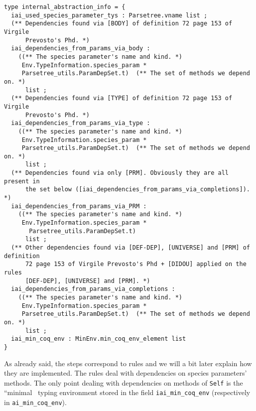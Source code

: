 {\footnotesize
\begin{lstlisting}[language=MyOCaml]
type internal_abstraction_info = {
  iai_used_species_parameter_tys : Parsetree.vname list ;
  (** Dependencies found via [BODY] of definition 72 page 153 of Virgile
      Prevosto's Phd. *)
  iai_dependencies_from_params_via_body :
    ((** The species parameter's name and kind. *)
     Env.TypeInformation.species_param *
     Parsetree_utils.ParamDepSet.t)  (** The set of methods we depend on. *)
      list ;
  (** Dependencies found via [TYPE] of definition 72 page 153 of Virgile
      Prevosto's Phd. *)
  iai_dependencies_from_params_via_type :
    ((** The species parameter's name and kind. *)
     Env.TypeInformation.species_param *
     Parsetree_utils.ParamDepSet.t)  (** The set of methods we depend on. *)
      list ;
  (** Dependencies found via only [PRM]. Obviously they are all present in
      the set below ([iai_dependencies_from_params_via_completions]). *)
  iai_dependencies_from_params_via_PRM :
    ((** The species parameter's name and kind. *)
     Env.TypeInformation.species_param *
       Parsetree_utils.ParamDepSet.t)
      list ;
  (** Other dependencies found via [DEF-DEP], [UNIVERSE] and [PRM] of definition
      72 page 153 of Virgile Prevosto's Phd + [DIDOU] applied on the rules
      [DEF-DEP], [UNIVERSE] and [PRM]. *)
  iai_dependencies_from_params_via_completions :
    ((** The species parameter's name and kind. *)
     Env.TypeInformation.species_param *
     Parsetree_utils.ParamDepSet.t)  (** The set of methods we depend on. *)
      list ;
  iai_min_coq_env : MinEnv.min_coq_env_element list
}
\end{lstlisting}
}

As already said, the steps correspond to rules and we will a bit later
explain how they are implemented. The rules deal with dependencies on
species parameters' methods. The only point dealing with
dependencies on methods of {\tt Self} is the ``minimal \coq\ typing
environment stored in the field {\tt iai\_min\_coq\_env} (respectively
in {\tt ai\_min\_coq\_env}).

